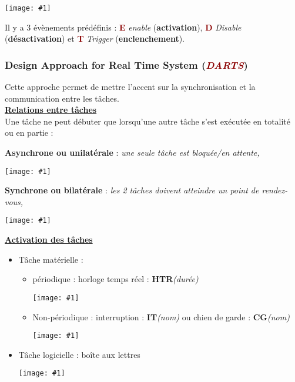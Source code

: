\documentclass{article}
\newcommand{\dred}[1]{\textcolor{darkred}{\textbf{#1}}}
\newcommand{\red}[1]{\textcolor{darkred}{#1}}
\newcommand{\imgR}[2]{\begin{center}\texttt{[image: \#1]}\end{center}}
\newcommand{\stitre}[1]{\noindent\textbf{\underline{#1}} \\}
\begin{document}
\imgR{ITR_007.png}{400}

\noindent Il y a 3 évènements prédéfinis : \dred{E} \textit{enable} (\textbf{activation}), \dred{D} 
\textit{Disable} (\textbf{désactivation}) et \dred{T} \textit{Trigger} (\textbf{enclenchement}).

\subsubsection{Design Approach for Real Time System (\textit{\red{DARTS}})}

Cette approche permet de mettre l'accent sur la synchronisation et la communication entre les tâches.\\

\stitre{Relations entre tâches}

Une tâche ne peut débuter que lorsqu'une autre tâche s'est exécutée en totalité ou en partie :

\begin{multicols}{2}
\textbf{Asynchrone ou unilatérale} : \textit{une seule tâche est bloquée/en attente,}
\imgR{ITR_008.png}{150}
\end{multicols}

\begin{multicols}{2}
\textbf{Synchrone ou bilatérale} : \textit{les 2 tâches doivent atteindre un point de rendez-vous,}
\imgR{ITR_009.png}{150}
\end{multicols}

\stitre{Activation des tâches}

\begin{itemize}
\item Tâche matérielle :
	\begin{itemize}
	\item \begin{multicols}{2}
			périodique : horloge temps réel : \textbf{HTR}\textit{(durée)}
			\imgR{ITR_010.png}{150}
		  \end{multicols}
  	\item \begin{multicols}{2}
			Non-périodique : interruption : \textbf{IT}\textit{(nom)} ou chien de garde : 
			\textbf{CG}\textit{(nom)}
			\imgR{ITR_011.png}{150}
		  \end{multicols}
	\end{itemize}
\item Tâche logicielle : boîte aux lettres \\
\imgR{ITR_012.png}{225}
\end{itemize}
\end{document}
